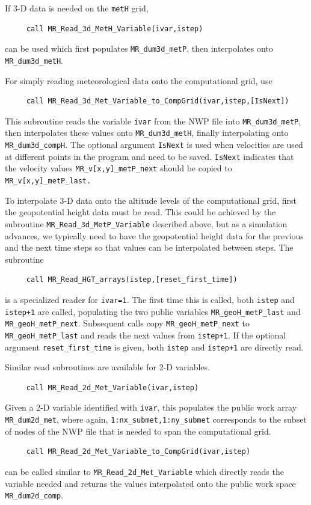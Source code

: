 \documentclass[11pt]{article}   %
\begin{document}
If 3-D data is needed on the \texttt{metH} grid,
\begin{verbatim}
     call MR_Read_3d_MetH_Variable(ivar,istep)
\end{verbatim}
can be used which first populates \texttt{MR\_dum3d\_metP}, then interpolates
onto \texttt{MR\_dum3d\_metH}.

For simply reading meteorological data onto the computational grid, use
\begin{verbatim}
     call MR_Read_3d_Met_Variable_to_CompGrid(ivar,istep,[IsNext])
\end{verbatim}
This subroutine reads the variable \texttt{ivar} from the NWP file into
\texttt{MR\_dum3d\_metP}, then interpolates these values onto \texttt{MR\_dum3d\_metH},
finally interpolating onto \texttt{MR\_dum3d\_compH}.  The optional argument
\texttt{IsNext} is used when velocities are used at different points in the program
and need to be saved.  \texttt{IsNext} indicates that the velocity values
\texttt{MR\_v[x,y]\_metP\_next} should be copied to \texttt{MR\_v[x,y]\_metP\_last.}

To interpolate 3-D data onto the altitude levels of the computational grid, first
the geopotential height data must be read.  This could be achieved by the subroutine
\texttt{MR\_Read\_3d\_MetP\_Variable} described above, but as a simulation advances, we
typically need to have the geopotential height data for the previous and the next time
steps so that values can be interpolated between steps.  The subroutine
\begin{verbatim}
     call MR_Read_HGT_arrays(istep,[reset_first_time])
\end{verbatim}
is a specialized reader for \texttt{ivar=1}.  The first time this is called, both
\texttt{istep} and \texttt{istep+1} are called, populating the two public variables
\texttt{MR\_geoH\_metP\_last} and \texttt{MR\_geoH\_metP\_next}.  Subsequent calls
copy \texttt{MR\_geoH\_metP\_next} to \texttt{MR\_geoH\_metP\_last} and reads
the next values from \texttt{istep+1}.  If the optional argument \texttt{reset\_first\_time}
is given, both \texttt{istep} and \texttt{istep+1} are directly read.


Similar read subroutines are available for 2-D variables.
\begin{verbatim}
     call MR_Read_2d_Met_Variable(ivar,istep)
\end{verbatim}
Given a 2-D variable identified with \texttt{ivar}, this populates the public
work array \texttt{MR\_dum2d\_met}, where again,
\texttt{1:nx\_submet,1:ny\_submet} corresponds to the subset of nodes of the NWP
file that is needed to span the computational grid.
\begin{verbatim}
     call MR_Read_2d_Met_Variable_to_CompGrid(ivar,istep)
\end{verbatim}
can be called similar to \texttt{MR\_Read\_2d\_Met\_Variable} which directly reads the
variable needed and returns the
values interpolated onto the public work space \texttt{MR\_dum2d\_comp}.
\end{document}
